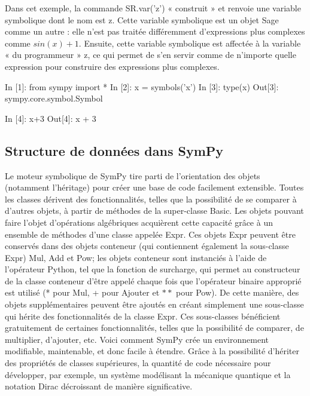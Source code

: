 Dans cet exemple, la commande SR.var(’z’) « construit » et renvoie une variable symbolique dont le nom est z. Cette variable symbolique est un objet Sage comme un autre : elle n’est pas traitée différemment d’expressions plus complexes comme $sin(x) + 1$. Ensuite, cette variable symbolique est affectée à la variable « du programmeur » z, ce qui permet de s’en servir comme de n’importe quelle expression pour construire des expressions plus complexes.


\begin{python}
In [1]: from sympy import *
In [2]: x = symbols('x')                                                                     
In [3]: type(x)
Out[3]: sympy.core.symbol.Symbol
\end{python}

\begin{python}
In [4]: x+3                                                                     
Out[4]: x + 3
\end{python}



\subsection{Structure de données dans SymPy}
Le moteur symbolique de SymPy tire parti de l'orientation des objets (notamment l'héritage) pour créer une base de code facilement extensible. Toutes les classes dérivent des fonctionnalités, telles que la possibilité de se comparer à d'autres objets, à partir de méthodes de la super-classe Basic. Les objets pouvant faire l'objet d'opérations algébriques acquièrent cette capacité grâce à un ensemble de méthodes d'une classe appelée Expr. Ces objets Expr peuvent être conservés dans des objets conteneur (qui contiennent également la sous-classe Expr) Mul, Add et Pow; les objets conteneur sont instanciés à l'aide de l'opérateur Python, tel que la fonction de surcharge, qui permet au constructeur de la classe conteneur d'être appelé chaque fois que l'opérateur binaire approprié est utilisé (* pour Mul, + pour Ajouter et $**$ pour Pow).
De cette manière, des objets supplémentaires peuvent être ajoutés en créant simplement une sous-classe qui hérite des fonctionnalités de la classe Expr. Ces sous-classes bénéficient gratuitement de certaines fonctionnalités, telles que la possibilité de comparer, de multiplier, d’ajouter, etc. Voici comment SymPy crée un environnement modifiable, maintenable, et donc facile à étendre. Grâce à la possibilité d'hériter des propriétés de classes supérieures, la quantité de code nécessaire pour développer, par exemple, un système modélisant la mécanique quantique et la notation Dirac décroissant de manière significative.

